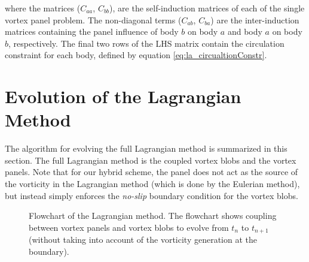 where the matrices ($C_{aa}$, $C_{bb}$), are the self-induction matrices of each of the single vortex panel problem. The non-diagonal terms ($C_{ab}$, $C_{ba}$) are the inter-induction matrices containing the panel influence of 
body $b$ on body $a$ and body $a$ on body $b$, respectively. The final two rows of the LHS matrix contain the circulation constraint for each body, defined by equation \ref{eq:la_circualtionConstr}.






\section{Evolution of the Lagrangian Method}
\label{sec:la-eolm}
The algorithm for evolving the full Lagrangian method is summarized in this section. The full Lagrangian method is the coupled vortex blobs and the vortex panels. Note that for our hybrid scheme, the panel does not act as the source of the vorticity in the Lagrangian method (which is done by the Eulerian method), but instead simply enforces the \emph{no-slip} boundary condition for the vortex blobs.
	
	\begin{figure}[!h]
		\centering
		\caption{Flowchart of the Lagrangian method. The flowchart shows coupling between vortex panels and vortex blobs to evolve from $t_n$ to $t_{n+1}$ (without taking into account of the vorticity generation at the boundary).}
		\label{fig:flowchart_lagrangian}
	\end{figure}	
	
